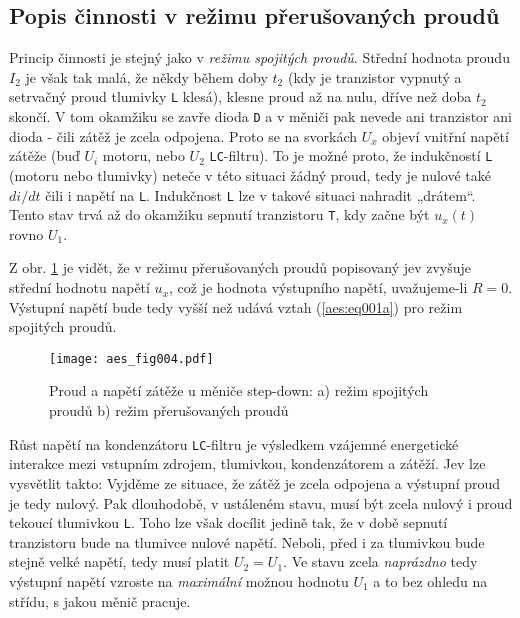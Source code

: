     \subsection{Popis činnosti v režimu přerušovaných proudů}
      Princip činnosti je stejný jako v \emph{režimu spojitých proudů}. Střední hodnota proudu 
      \(I_2\) je však tak malá, že někdy během doby \(t_2\) (kdy je tranzistor vypnutý a setrvačný 
      proud tlumivky \texttt{L} klesá), klesne proud až na nulu, dříve než doba \(t_2\) skončí. V 
      tom okamžiku se zavře dioda \texttt{D} a v měniči pak nevede ani tranzistor ani dioda - čili 
      zátěž je zcela odpojena. Proto se na svorkách \(U_x\) objeví vnitřní napětí zátěže
      (buď \(U_i\) motoru, nebo \(U_2\) \texttt{LC}-filtru). To je možné proto, že indukčností 
      \texttt{L} (motoru nebo tlumivky) neteče v této situaci žádný proud, tedy je nulové také 
      \(di/dt\) čili i napětí na \texttt{L}. Indukčnost \texttt{L} lze v takové situaci nahradit 
      „drátem“. Tento stav trvá až do okamžiku sepnutí tranzistoru \texttt{T}, kdy začne být 
      \(u_x(t)\) rovno \(U_1\).
      
      Z obr. \ref{aes:fig004} je vidět, že v režimu přerušovaných proudů popisovaný jev zvyšuje 
      střední hodnotu napětí \(u_x\), což je hodnota výstupního napětí, uvažujeme-li \(R = 0\). 
      Výstupní napětí bude tedy vyšší než  udává vztah (\ref{aes:eq001a}) pro režim spojitých 
      proudů.
      
      \begin{figure}[ht!]
        \centering
        \texttt{[image: aes\_fig004.pdf]}
        \caption{Proud a napětí zátěže u měniče step-down: a) režim spojitých proudů
                 b) režim přerušovaných proudů}
        \label{aes:fig004}
      \end{figure} 
      Růst napětí na kondenzátoru \texttt{LC}-filtru je výsledkem vzájemné energetické interakce 
      mezi vstupním zdrojem, tlumivkou, kondenzátorem a zátěží. Jev lze vysvětlit takto:
      Vyjděme ze situace, že zátěž je zcela odpojena a výstupní proud je tedy nulový. Pak 
      dlouhodobě, v ustáleném stavu, musí být zcela nulový i proud tekoucí tlumivkou \texttt{L}. 
      Toho lze však docílit jedině tak, že v době sepnutí tranzistoru bude na tlumivce nulové 
      napětí. Neboli, před i za tlumivkou bude stejně velké napětí, tedy musí platit \(U_2 = U_1\). 
      Ve stavu zcela \emph{naprázdno} tedy výstupní napětí vzroste na \emph{maximální} možnou 
      hodnotu \(U_1\) a to bez ohledu na střídu, s jakou měnič pracuje.
      
